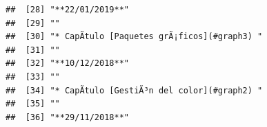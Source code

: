 \documentclass[
]{book}
\begin{document}
\begin{verbatim}
##  [28] "**22/01/2019**"                                                                                                                                                                                                                                                                                          
##  [29] ""                                                                                                                                                                                                                                                                                                        
##  [30] "* CapÃ­tulo [Paquetes grÃ¡ficos](#graph3) "                                                                                                                                                                                                                                                              
##  [31] ""                                                                                                                                                                                                                                                                                                        
##  [32] "**10/12/2018**"                                                                                                                                                                                                                                                                                          
##  [33] ""                                                                                                                                                                                                                                                                                                        
##  [34] "* CapÃ­tulo [GestiÃ³n del color](#graph2) "                                                                                                                                                                                                                                                              
##  [35] ""                                                                                                                                                                                                                                                                                                        
##  [36] "**29/11/2018**"                                                                                                                                                                                                                                                                                          

\end{verbatim}
\end{document}
